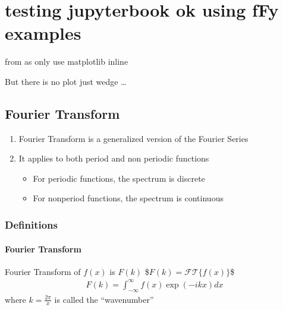 \documentclass[letterpaper,10pt,english]{jupyterBook}
\begin{document}
\sphinxstepscope


\chapter{testing jupyter\sphinxhyphen{}book ok using fFy examples}
\label{\detokenize{fFy:testing-jupyter-book-ok-using-ffy-examples}}\label{\detokenize{fFy::doc}}
\sphinxAtStartPar
from 
as only use matplotlib inline

\sphinxAtStartPar
But there is no plot just wedge …


\section{Fourier Transform}
\label{\detokenize{fFy:fourier-transform}}\begin{enumerate}
%
\item {} 
\sphinxAtStartPar
Fourier Transform is a generalized version of the Fourier Series

\item {} 
\sphinxAtStartPar
It applies to both period and non periodic functions
\begin{itemize}
\item {} 
\sphinxAtStartPar
For periodic functions, the spectrum is discrete

\item {} 
\sphinxAtStartPar
For non\sphinxhyphen{}period functions, the spectrum is continuous

\end{itemize}

\end{enumerate}


\subsection{Definitions}
\label{\detokenize{fFy:definitions}}

\subsubsection{Fourier Transform}
\label{\detokenize{fFy:id1}}
\sphinxAtStartPar
Fourier Transform of \(f(x)\) is \(F(k)\)
\$\(
F(k) = \mathcal{FT}\{f(x)\}
\)\$
\begin{equation*}
\begin{split}
F(k) = \int_{-\infty}^{\infty}f(x) \exp(-ikx)dx
\end{split}
\end{equation*}
\sphinxAtStartPar
where \(k=\frac{2\pi}{x}\) is called the “wavenumber”
\end{document}
